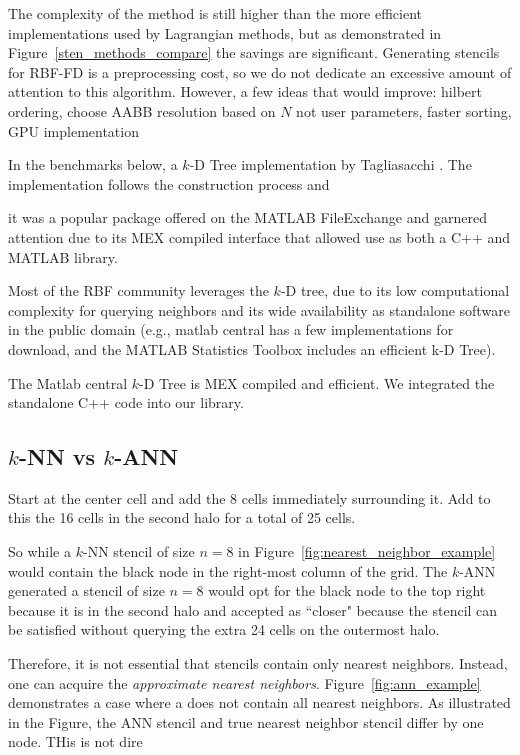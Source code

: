 \documentclass{report}
\begin{document}
The complexity of the method is still higher than the more efficient implementations used by Lagrangian methods, but as demonstrated in Figure~\ref{sten_methods_compare} the savings are significant. Generating stencils for RBF-FD is a preprocessing cost, so we do not dedicate an excessive amount of attention to this algorithm. However, a few ideas that would improve: hilbert ordering, choose AABB resolution based on $N$ not user parameters, faster sorting, GPU implementation



In the benchmarks below, a $k$-D Tree implementation by Tagliasacchi \cite{TagliasacchiGC,TagliasacchiMFE}. The implementation follows the construction process and 

it was a popular package offered on the MATLAB FileExchange and garnered attention due to its MEX compiled interface that allowed use as both a C++ and MATLAB library. 

  Most of the RBF community leverages the $k$-D tree, due to its low computational complexity for querying neighbors and its wide availability as standalone software in the public domain (e.g., matlab central has a few implementations for download, and the MATLAB Statistics Toolbox includes an efficient k-D Tree). 

The Matlab central $k$-D Tree is MEX compiled and efficient. We integrated the standalone C++ code into our library.  


\subsection{$k$-NN vs $k$-ANN} 

Start at the center cell and add the 8 cells immediately surrounding it. Add to this the 16 cells in the second halo for a total of 25 cells. 

So while a $k$-NN stencil of size $n=8$ in Figure~\ref{fig:nearest_neighbor_example} would contain the black node in the right-most column of the grid. The $k$-ANN generated a stencil of size $n=8$ would opt for the black node to the top right because it is in the second halo and accepted as ``closer" because the stencil can be satisfied without querying the extra 24 cells on the outermost halo. 


Therefore, it is not essential that stencils contain only nearest neighbors. Instead, one can acquire the \emph{approximate nearest neighbors}. Figure~\ref{fig:ann_example} demonstrates a case where a does not contain all nearest neighbors. As illustrated in the Figure, the ANN stencil and true nearest neighbor stencil differ by one node. THis is not dire
\end{document}

